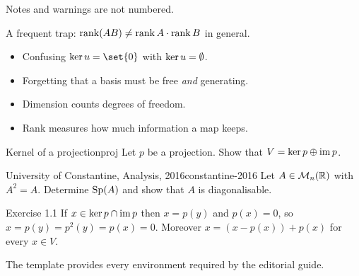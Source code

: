 \documentclass[print]{docmathdz}
\begin{document}
\begin{note}
Notes and warnings are not numbered.
\end{note}

\begin{warning}
A frequent trap: $\operatorname{rank}(AB)\neq\operatorname{rank} A\cdot\operatorname{rank} B$ in general.
\end{warning}

\begin{mistakes}
\begin{itemize}
  \item Confusing $\Ker u=\set{0}$ with $\operatorname{ker} u=\emptyset$.
  \item Forgetting that a basis must be free \emph{and} generating.
\end{itemize}
\end{mistakes}

\begin{keypoints}
\begin{itemize}
  \item Dimension counts degrees of freedom.
  \item Rank measures how much information a map keeps.
\end{itemize}
\end{keypoints}

\begin{exercise}{Kernel of a projection}{proj}
Let $p$ be a projection. Show that $V=\operatorname{ker} p\oplus\operatorname{im} p$.
\end{exercise}

\begin{problem}{University of Constantine, Analysis, 2016}{constantine-2016}
Let $A\in\mathcal{M}_{n}(\mathbb{R})$ with $A^{2}=A$. Determine $\operatorname{Sp}(A)$ and show that $A$ is
diagonalisable.
\end{problem}

\begin{solution}{Exercise 1.1}
If $x\in\operatorname{ker} p\cap\operatorname{im} p$ then $x=p(y)$ and $p(x)=0$, so $x=p(y)=p^{2}(y)=p(x)=0$.
Moreover $x=(x-p(x))+p(x)$ for every $x\in V$.
\end{solution}

\begin{summarybox}
The template provides every environment required by the editorial guide.
\end{summarybox}

\printindex
\end{document}
